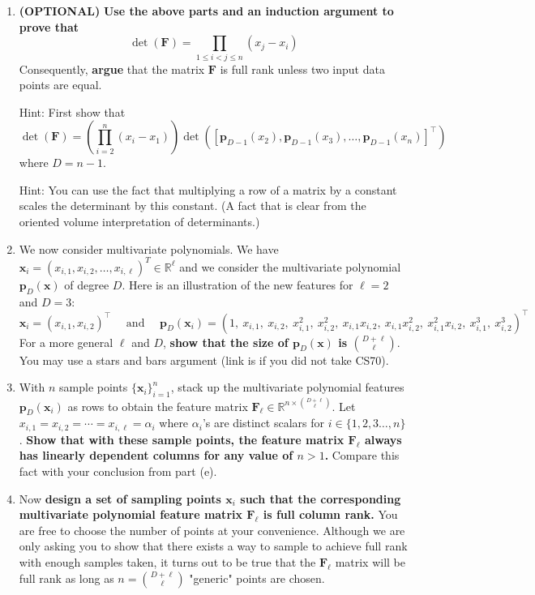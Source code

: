 \documentclass{article}\usepackage[utf8]{inputenc}\usepackage[margin=0.4cm,top=0.4cm,bottom=0.4cm]{geometry}\usepackage[usenames,dvipsnames,svgnames,table]{xcolor}
\begin{document}
\begin{enumerate}
\EndSolution
\item \textbf{(OPTIONAL)} \textbf{Use the above parts and an induction argument to prove that} $$\det(\mathbf{F}) = \prod_{1 \leqslant i < j \leqslant n} (x_j - x_i)$$ Consequently, \textbf{argue} that the matrix $\mathbf{F}$ is full rank unless two input data points are equal.
\vspace{4pt}

Hint: First show that $$\det(\mathbf{F}) = \left(\prod_{i=2}^n(x_i-x_1)\right)\det\left(\left[\mathbf{p}_{D-1}(x_2), \mathbf{p}_{D-1}(x_3),\ldots,\mathbf{p}_{D-1}(x_n)\right]^\top\right)$$ where $D=n-1$.
\vspace{4pt}

Hint: You can use the fact that multiplying a row of a matrix by a constant scales the determinant by this constant. (A fact that is clear from the oriented volume interpretation of determinants.)
\BeginSolution

\EndSolution
\item We now consider multivariate polynomials. We have $\mathbf{x}_i = (x_{i,1}, x_{i,2}, \ldots , x_{i,\ell})^T \in \mathbb{R}^\ell$ and we consider the multivariate polynomial $\mathbf{p}_D(\mathbf{x})$ of degree $D$. Here is an illustration of the new features for $\ell=2$ and $D=3$: $$\mathbf{x}_i = (x_{i,1},x_{i,2})^\top\quad\text{ and }\quad \mathbf{p}_D(\mathbf{x}_i) = (1,\ x_{i, 1},\ x_{i, 2},\ x_{i, 1}^2,\ x_{i, 2}^2,\ x_{i, 1}x_{i,2},\ x_{i, 1}x_{i,2}^2,\ x_{i, 1}^2x_{i, 2},\ x_{i, 1}^3,\ x_{i, 2}^3)^\top$$ For a more general $\ell$ and $D$, \textbf{show that the size of $\mathbf{p}_D(\mathbf{x})$ is $\binom{D + \ell}{\ell}$}. You may use a stars and bars argument (link is \href{https://inst.eecs.berkeley.edu/~cs70/fa15/slides/lec-18.6up.pdf}{\color{brown}{here}} if you did not take CS70).
\BeginSolution

\EndSolution
\item With $n$ sample points $\{\mathbf{x}_i\}_{i=1}^n$, stack up the multivariate polynomial features $\mathbf{p}_D(\mathbf{x}_i)$ as rows to obtain the feature matrix $\mathbf{F}_{\ell} \in \mathbb{R}^{n \times \binom{D + \ell}{\ell}}$. Let $x_{i,1} = x_{i,2} = \cdots  = x_{i,\ell} = \alpha_i$ where $\alpha_i$'s are distinct scalars for $i \in \{1, 2, 3 \ldots, n\}$. \textbf{Show that with these sample points, the feature matrix $\mathbf{F}_{\ell}$ always has linearly dependent columns for any value of $n > 1$.} Compare this fact with your conclusion from part (e).
\BeginSolution

\EndSolution
\item Now \textbf{design a set of sampling points $\mathbf{x}_i$ such that the corresponding multivariate polynomial feature matrix $\mathbf{F}_{\ell}$ is full column rank.} You are free to choose the number of points at your convenience. Although we are only asking you to show that there exists a way to sample to achieve full rank with enough samples taken, it turns out to be true that the $\mathbf{F}_{\ell}$ matrix will be full rank as long as $n=\binom{D + \ell}{\ell}$ "generic" points are chosen.
\vspace{4pt}


\end{enumerate}
\end{document}
